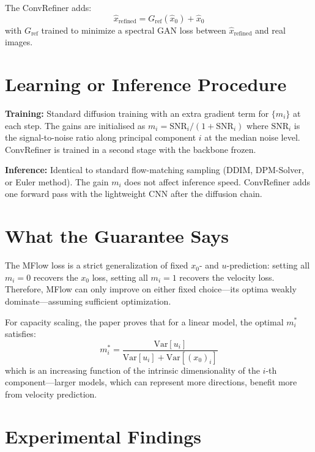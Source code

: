 \documentclass[10pt,twocolumn]{article}
\begin{document}
The ConvRefiner adds:
\[
\hat{x}_\mathrm{refined} = G_\mathrm{ref}(\hat{x}_0) + \hat{x}_0
\]
with $G_\mathrm{ref}$ trained to minimize a spectral GAN loss between
$\hat{x}_\mathrm{refined}$ and real images.

\section{Learning or Inference Procedure}

\textbf{Training:} Standard diffusion training with an extra gradient
term for $\{m_i\}$ at each step. The gains are initialised as
$m_i = \text{SNR}_i / (1 + \text{SNR}_i)$ where $\text{SNR}_i$ is
the signal-to-noise ratio along principal component $i$ at the median
noise level. ConvRefiner is trained in a second stage with the
backbone frozen.

\textbf{Inference:} Identical to standard flow-matching sampling
(DDIM, DPM-Solver, or Euler method). The gain $m_i$ does not affect
inference speed. ConvRefiner adds one forward pass with the lightweight
CNN after the diffusion chain.

\section{What the Guarantee Says}

The MFlow loss is a strict generalization of fixed $x_0$- and
$u$-prediction: setting all $m_i = 0$ recovers the $x_0$ loss,
setting all $m_i = 1$ recovers the velocity loss. Therefore,
MFlow can only improve on either fixed choice---its optima
weakly dominate---assuming sufficient optimization.

For capacity scaling, the paper proves that for a linear model,
the optimal $m_i^*$ satisfies:
\[
m_i^* = \frac{\mathrm{Var}[u_i]}{\mathrm{Var}[u_i] + \mathrm{Var}[(x_0)_i]}
\]
which is an increasing function of the intrinsic dimensionality of
the $i$-th component---larger models, which can represent more
directions, benefit more from velocity prediction.

\section{Experimental Findings}
\end{document}
